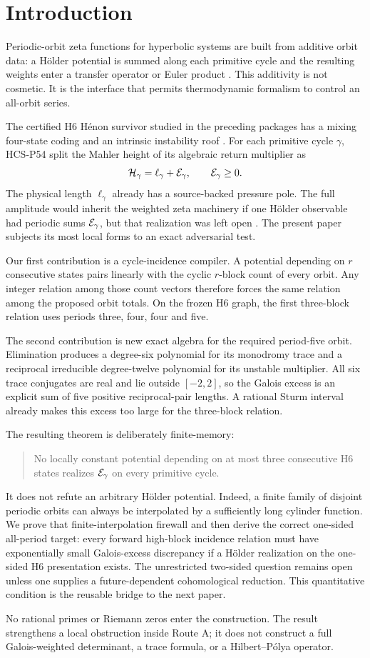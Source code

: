 \section{Introduction}

Periodic-orbit zeta functions for hyperbolic systems are built from additive
orbit data: a H\"older potential is summed along each primitive cycle and the
resulting weights enter a transfer operator or Euler product
\citep{Bowen1975,ParryPollicott1990}.  This additivity is not cosmetic.  It is
the interface that permits thermodynamic formalism to control an all-orbit
series.

The certified H6 H\'enon survivor studied in the preceding packages has a
mixing four-state coding and an intrinsic instability roof
\citep{WangP31}.  For each primitive cycle \(\gamma\), HCS-P54 split the Mahler
height of its algebraic return multiplier as
\begin{equation}\label{eq:split-intro}
 \mathcal H_\gamma=\ell_\gamma+\mathcal E_\gamma,
 \qquad \mathcal E_\gamma\geq 0.
\end{equation}
The physical length \(\ell_\gamma\) already has a source-backed pressure pole.
The full amplitude would inherit the weighted zeta machinery if one H\"older
observable had periodic sums \(\mathcal E_\gamma\), but that realization was left
open \citep{WangP54}.  The present paper subjects its most local forms to an
exact adversarial test.

Our first contribution is a cycle-incidence compiler.  A potential depending
on \(r\) consecutive states pairs linearly with the cyclic \(r\)-block count
of every orbit.  Any integer relation among those count vectors therefore
forces the same relation among the proposed orbit totals.  On the frozen H6
graph, the first three-block relation uses periods three, four, four and five.

The second contribution is new exact algebra for the required period-five
orbit.  Elimination produces a degree-six polynomial for its monodromy trace
and a reciprocal irreducible degree-twelve polynomial for its unstable
multiplier.  All six trace conjugates are real and lie outside \([-2,2]\), so
the Galois excess is an explicit sum of five positive reciprocal-pair lengths.
A rational Sturm interval already makes this excess too large for the
three-block relation.

The resulting theorem is deliberately finite-memory:
\begin{quote}
No locally constant potential depending on at most three consecutive H6
states realizes \(\mathcal E_\gamma\) on every primitive cycle.
\end{quote}
It does not refute an arbitrary H\"older potential.  Indeed, a finite family
of disjoint periodic orbits can always be interpolated by a sufficiently
long cylinder function.  We prove that finite-interpolation firewall and then
derive the correct one-sided all-period target: every forward high-block
incidence relation must have exponentially small Galois-excess discrepancy
if a H\"older realization on the one-sided H6 presentation exists.  The
unrestricted two-sided question remains open unless one supplies a
future-dependent cohomological reduction.  This quantitative condition is
the reusable bridge to the next paper.

No rational primes or Riemann zeros enter the construction.  The result
strengthens a local obstruction inside Route A; it does not construct a full
Galois-weighted determinant, a trace formula, or a Hilbert--P\'olya operator.
